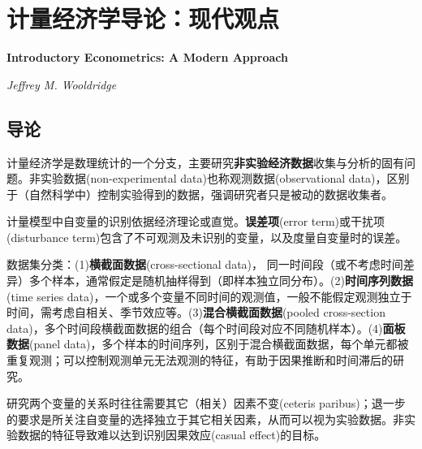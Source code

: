 \chapter{计量经济学导论：现代观点}
\Large\textbf{Introductory Econometrics: A Modern Approach}
\par \emph{Jeffrey M. Wooldridge} \normalsize

\section{导论}

\par 计量经济学是数理统计的一个分支，主要研究\textbf{非实验经济数据}收集与分析的固有问题。非实验数据(non-experimental data)也称观测数据(observational data)，区别于（自然科学中）控制实验得到的数据，强调研究者只是被动的数据收集者。

\par 计量模型中自变量的识别依据经济理论或直觉。\textbf{误差项}(error term)或干扰项(disturbance term)包含了不可观测及未识别的变量，以及度量自变量时的误差。

\par 数据集分类：(1)\textbf{横截面数据}(cross-sectional data)， 同一时间段（或不考虑时间差异）多个样本，通常假定是随机抽样得到（即样本独立同分布）。(2)\textbf{时间序列数据}(time series data)，一个或多个变量不同时间的观测值，一般不能假定观测独立于时间，需考虑自相关、季节效应等。(3)\textbf{混合横截面数据}(pooled cross-section data)，多个时间段横截面数据的组合（每个时间段对应不同随机样本）。(4)\textbf{面板数据}(panel data)，多个样本的时间序列，区别于混合横截面数据，每个单元都被重复观测；可以控制观测单元无法观测的特征，有助于因果推断和时间滞后的研究。

\par 研究两个变量的关系时往往需要其它（相关）因素不变(ceteris paribus)；退一步的要求是所关注自变量的选择独立于其它相关因素，从而可以视为实验数据。非实验数据的特征导致难以达到识别因果效应(casual effect)的目标。